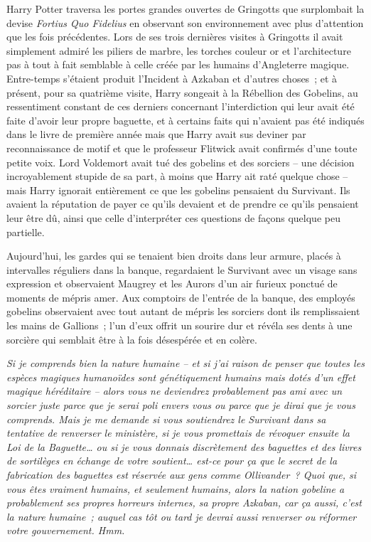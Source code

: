 Harry Potter traversa les portes grandes ouvertes de Gringotts que surplombait la devise \emph{Fortius Quo Fidelius} en observant son environnement avec plus d'attention que les fois précédentes. Lors de ses trois dernières visites à Gringotts il avait simplement admiré les piliers de marbre, les torches couleur or et l'architecture pas à tout à fait semblable à celle créée par les humains d'Angleterre magique. Entre-temps s'étaient produit l'Incident à Azkaban et d'autres choses~; et à présent, pour sa quatrième visite, Harry songeait à la Rébellion des Gobelins, au ressentiment constant de ces derniers concernant l'interdiction qui leur avait été faite d'avoir leur propre baguette, et à certains faits qui n'avaient pas été indiqués dans le livre de première année mais que Harry avait sus deviner par reconnaissance de motif et que le professeur Flitwick avait confirmés d'une toute petite voix. Lord Voldemort avait tué des gobelins et des sorciers -- une décision incroyablement stupide de sa part, à moins que Harry ait raté quelque chose -- mais Harry ignorait entièrement ce que les gobelins pensaient du Survivant. Ils avaient la réputation de payer ce qu'ils devaient et de prendre ce qu'ils pensaient leur être dû, ainsi que celle d'interpréter ces questions de façons quelque peu partielle.

Aujourd'hui, les gardes qui se tenaient bien droits dans leur armure, placés à intervalles réguliers dans la banque, regardaient le Survivant avec un visage sans expression et observaient Maugrey et les Aurors d'un air furieux ponctué de moments de mépris amer. Aux comptoirs de l'entrée de la banque, des employés gobelins observaient avec tout autant de mépris les sorciers dont ils remplissaient les mains de Gallions~; l'un d'eux offrit un sourire dur et révéla ses dents à une sorcière qui semblait être à la fois désespérée et en colère.

\emph{Si je comprends bien la nature humaine -- et si j'ai raison de penser que toutes les espèces magiques humanoïdes sont génétiquement humains mais dotés d'un effet magique héréditaire -- alors vous ne deviendrez probablement pas ami avec un sorcier juste parce que je serai poli envers vous ou parce que je dirai que je vous comprends. Mais je me demande si vous soutiendrez le Survivant dans sa tentative de renverser le ministère, si je vous promettais de révoquer ensuite la Loi de la Baguette… ou si je vous donnais discrètement des baguettes et des livres de sortilèges en échange de votre soutient… est-ce pour ça que le secret de la fabrication des baguettes est réservée aux gens comme Ollivander~? Quoi que, si vous êtes vraiment humains, et seulement humains, alors la nation gobeline a probablement ses propres horreurs internes, sa propre Azkaban, car ça aussi, c'est la nature humaine~; auquel cas tôt ou tard je devrai aussi renverser ou réformer votre gouvernement. Hmm.}

